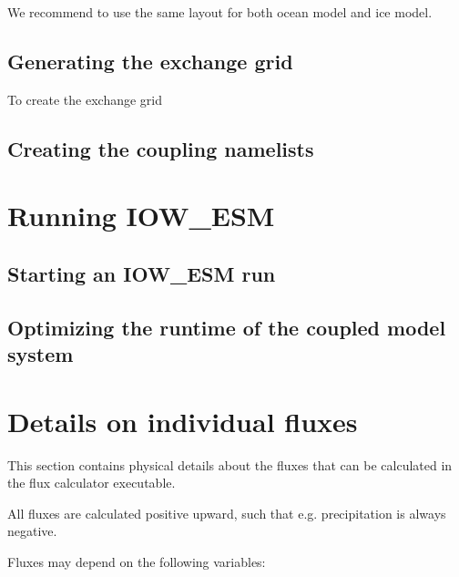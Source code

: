 \documentclass[a4paper,titlepage]{scrartcl}
\begin{document}
We recommend to use the same layout for both ocean model and ice model.


\subsection{Generating the exchange grid}
To create the exchange grid

\subsection{Creating the coupling namelists}

\newpage
\section{Running IOW\_ESM}
\subsection{Starting an IOW\_ESM run}
\subsection{Optimizing the runtime of the coupled model system}
\label{sec:optimizing}

\newpage
\section{Details on individual fluxes}
This section contains physical details about the fluxes that can be calculated in the flux calculator executable.

All fluxes are calculated positive upward, such that e.g. precipitation is always negative.

Fluxes may depend on the following variables:
\end{document}
